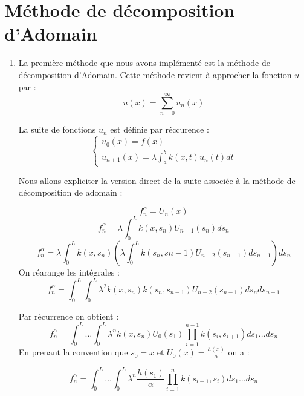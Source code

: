 \documentclass{article}
\begin{document}
\section{Méthode de décomposition d'Adomain}
\begin{enumerate}
    \item La première méthode que nous avons implémenté est la méthode de décomposition d'Adomain. Cette méthode revient à approcher la fonction $u$ par : $$u(x)=\sum_{n=0}^{\infty} u_n(x)$$

La suite de fonctions $u_n$ est définie par réccurence :\\

\begin{equation}
    
\left\{
    \begin{array}{ll}
        u_0(x) = f(x) \\
        u_{n+1}(x) = \lambda \displaystyle\int_{a}^{b} k(x,t)u_n(t)dt
    \end{array}
\right.
\end{equation}

Nous allons expliciter la version direct de la suite associée à la méthode de décomposition de adomain :

\begin{equation}
    f_n^\alpha = U_n(x)
\end{equation}
\begin{equation}
    f_n^\alpha = \lambda \displaystyle\int_0^L k(x,s_n)U_{n-1}(s_n) ds_n
\end{equation}
\begin{equation}
    f_n^\alpha = \lambda \displaystyle\int_0^L k(x,s_n) (\lambda\displaystyle\int_0^L k(s_n,s{n-1}) U_{n-2}(s_{n-1})ds_{n-1})ds_n 
\end{equation}
On réarange les intégrales : 
\begin{equation}
    f_n^\alpha = \displaystyle\int_0^L \displaystyle\int_0^L \lambda^2 k(x,s_n)k(s_n,s_{n-1}) U_{n-2}(s_{n-1})ds_n ds_{n-1}
\end{equation}

Par récurrence on obtient :
\begin{equation}
    f_n^\alpha = \displaystyle\int_0^L \ldots \displaystyle\int_0^L \lambda^n k(x,s_n) U_0(s_1)\prod_{i=1}^{n-1} k(s_i, s_{i+1}) ds_1 \ldots ds_n
\end{equation}
En prenant la convention que $s_0 = x$ et $U_0(x) = \frac{h(x)}{\alpha}$ on a :

\begin{equation}
    f_n^\alpha = \displaystyle\int_0^L \ldots \displaystyle\int_0^L \lambda^n \frac{h(s_1)}{\alpha} \prod_{i=1}^n k(s_{i-1},s_i) ds_1 \ldots ds_n
\end{equation}


\end{enumerate}
\end{document}
